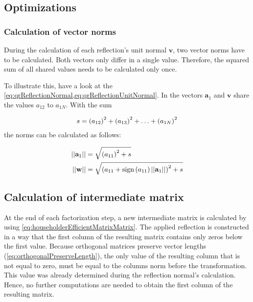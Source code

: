 


\subsection{Optimizations}
\label{sec:qrOptimizations}




\subsubsection{Calculation of vector norms}
\label{sec:qrOptimizationsVectorNorms}

During the calculation of each reflection's unit normal $\mathbf{v}$, two vector norms have to be calculated.
Both vectors only differ in a single value.
Therefore, the squared sum of all shared values needs to be calculated only once.

To illustrate this, have a look at the \cref{eq:qrReflectionNormal,eq:qrReflectionUnitNormal}.
In the vectors $\mathbf{a}_1$ and $\mathbf{v}$ share the values $a_{12}$ to $a_{1N}$.
With the sum 

\begin{align}
s =  \left(a_{12}\right)^2  + \left(a_{13}\right)^2 + \hdots + \left(a_{1N}\right)^2  
\end{align}
%
the norms can be calculated as follows:

\begin{align}
\left\vert\left\vert\mathbf{a}_1\right\vert\right\vert &= \sqrt{\left(a_{11}\right)^2 + s}\\
\left\vert\left\vert\mathbf{w}\right\vert\right\vert &= \sqrt{\left(a_{11} + \textrm{sign}\left(a_{11}\right) \left\vert\left\vert\mathbf{a}_1\right\vert\right\vert\right)^2 + s}
\end{align}




\subsection{Calculation of intermediate matrix}
\label{sec:qrOptimizationsFirstColumn}

At the end of each factorization step, a new intermediate matrix is calculated by using \cref{eq:householderEfficientMatrixMatrix}.
The applied reflection is constructed in a way that the first column of the resulting matrix contains only zeros below the first value.
Because orthogonal matrices preserve vector lengths (\cref{eq:orthogonalPreserveLength}), the only value of the resulting column that is not equal to zero, must be equal to the columns norm before the transformation.
This value was already determined during the reflection normal's calculation.
Hence, no further computations are needed to obtain the first column of the resulting matrix.



